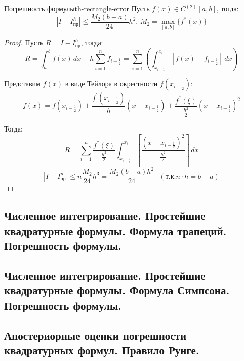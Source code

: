 \documentclass[14pt]{extarticle}
\begin{document}
    \begin{theorem}{Погрешность формулы}{th-rectangle-error}
        Пусть $f(x) \in C^{(2)}[a, b]$, тогда:
        $$|I - I_{\text{пр}}^{h}| \leq \frac{M_{2}(b - a)}{24}h^{2} \text{, } M_{2} = \max_{[a, b]}\{f^{''}(x)\}$$
    
        \begin{proof}
            Пусть $R = I - I_{\text{пр}}^{h}$, тогда:
            $$R = \int_{a}^{b} f(x) \, dx - h \sum_{i = 1}^{n} f_{i - \frac{1}{2}} = \sum_{i = 1}^{n} (\int_{x_{i-1}}^{x_{i}} [f(x) - f_{i - \frac{1}{2}}] \, dx)$$
        
            Представим $f(x)$ в виде Тейлора в окрестности $f(x_{i - \frac{1}{2}})$:
            $$f(x) = f(x_{i - \frac{1}{2}}) + \frac{f^{'}(x_{i - \frac{1}{2}})}{h}(x - x_{i - \frac{1}{2}}) + \frac{f^{''}(\xi)}{\frac{h^{2}}{2}}(x - x_{i - \frac{1}{2}})^{2}$$
        
            Тогда:
            $$R = \sum_{i = 1}^{n} \frac{f^{''}(\xi)}{\frac{h^{2}}{2}} \int_{x_{i - \frac{1}{2}}}^{x_{i}} [\frac{(x - x_{i - \frac{1}{2}})^{2}}{\frac{h^{2}}{2}}] \, dx$$
            $$|I - I_{\text{пр}}^{n}| \leq n \frac{M_{2}}{24}h^{3} = \frac{M_{2}(b - a)h^{2}}{24} \text{ } (\text{т.к.} n \cdot h = b - a)$$

        \end{proof}
    \end{theorem}

\clearpage
\subsection{Численное интегрирование. Простейшие квадратурные формулы. Формула трапеций. Погрешность формулы.}

\clearpage
\subsection{Численное интегрирование. Простейшие квадратурные формулы. Формула Симпсона. Погрешность формулы.}

\clearpage
\subsection{Апостериорные оценки погрешности квадратурных формул. Правило Рунге.}
\end{document}
